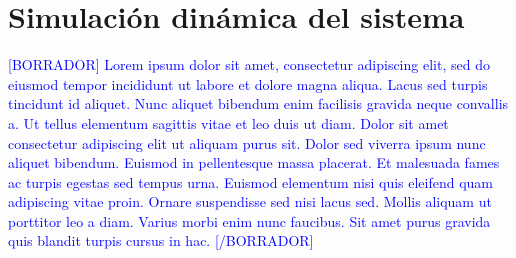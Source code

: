 \section{Simulación dinámica del sistema}

\textcolor{blue}{[BORRADOR] Lorem ipsum dolor sit amet, consectetur adipiscing elit, sed do eiusmod tempor incididunt ut labore et dolore magna aliqua. Lacus sed turpis tincidunt id aliquet. Nunc aliquet bibendum enim facilisis gravida neque convallis a. Ut tellus elementum sagittis vitae et leo duis ut diam. Dolor sit amet consectetur adipiscing elit ut aliquam purus sit. Dolor sed viverra ipsum nunc aliquet bibendum. Euismod in pellentesque massa placerat. Et malesuada fames ac turpis egestas sed tempus urna. Euismod elementum nisi quis eleifend quam adipiscing vitae proin. Ornare suspendisse sed nisi lacus sed. Mollis aliquam ut porttitor leo a diam. Varius morbi enim nunc faucibus. Sit amet purus gravida quis blandit turpis cursus in hac. [/BORRADOR]} 


